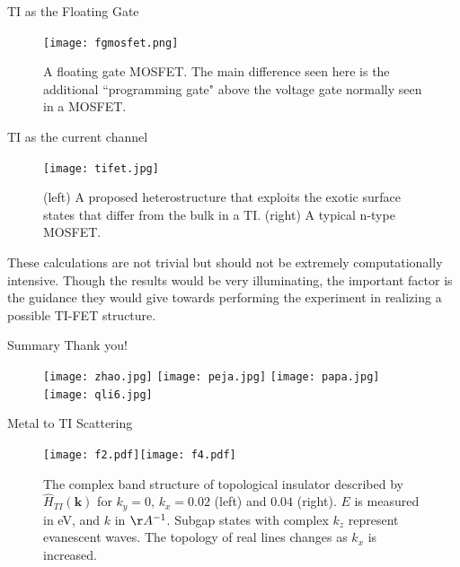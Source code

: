 \documentclass[]{beamer}
\def\v#1{\mathbf{#1}}
\begin{document}
\begin{frame}{TI as the Floating Gate}

\begin{figure}[h]
\center
\texttt{[image: fgmosfet.png]}
\caption{A floating gate MOSFET. The main difference seen here is the additional ``programming gate" above the voltage gate normally seen in a MOSFET.
}\label{fgmosfet}
\end{figure}

\clearpage
\end{frame}  

\begin{frame}{TI as the current channel}

\begin{figure}[h]
\center
\texttt{[image: tifet.jpg]}
\caption{(left) A proposed heterostructure that exploits the exotic surface states that differ from the bulk in a TI. (right) A typical n-type MOSFET.
}\label{tifet}
\end{figure}

\end{frame}  

\begin{frame}{}
These calculations are not trivial but should not be extremely computationally intensive. Though the results would be very illuminating, the important factor is the guidance they would give towards performing the experiment in realizing a possible TI-FET structure.

\end{frame}  


\begin{frame}{Summary}
\center \Large Thank you!

\begin{figure}[h]
\center
\texttt{[image: zhao.jpg]}
\texttt{[image: peja.jpg]}
\texttt{[image: papa.jpg]}
\texttt{[image: qli6.jpg]}
\end{figure}
\end{frame}  


%





\begin{frame}{Metal to TI Scattering}
\begin{figure}
\center
\texttt{[image: f2.pdf]}\texttt{[image: f4.pdf]}
\caption{The complex band structure
of topological insulator described by $\hat{H}_{TI}(\v{k})$ 
for $k_y=0$, $k_x=0.02$ (left) and $0.04$ (right). $E$ is measured in eV, and $k$ in $\AA^{-1}$.
Subgap states with complex $k_z$ represent evanescent waves. 
The topology of  real lines \cite{heine63}  changes as $k_x$ is increased.  
}
\end{figure}
\end{frame}
\end{document}
